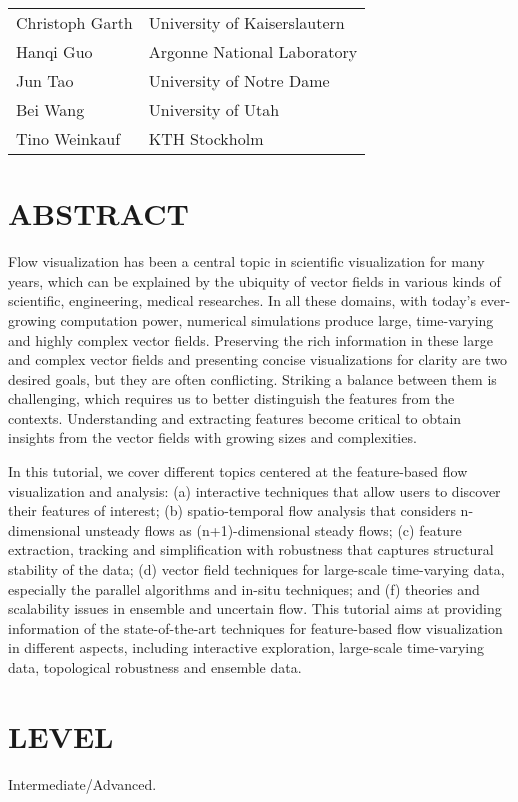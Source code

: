 \documentclass[preprint,journal]{vgtc}       %
\begin{document}
\vspace{-0.1in}
\begin{table}[H]
\begin{tabular}{ll}
Christoph Garth & University of Kaiserslautern\\
Hanqi Guo & Argonne National Laboratory\\
Jun Tao & University of Notre Dame\\
Bei Wang & University of Utah\\
Tino Weinkauf & KTH Stockholm
\end{tabular}
\end{table}

\section*{ABSTRACT}
Flow visualization has been a central topic in scientific visualization for many years, which can be explained by the ubiquity of vector fields in various kinds of scientific, engineering, medical researches. In all these domains, with today's ever-growing computation power, numerical simulations produce large, time-varying and highly complex vector fields. Preserving the rich information in these large and complex vector fields and presenting concise visualizations for clarity are two desired goals, but they are often conflicting. Striking a balance between them is challenging, which requires us to better distinguish the features from the contexts. Understanding and extracting features become critical to obtain insights from the vector fields with growing sizes and complexities.

In this tutorial, we cover different topics centered at the feature-based flow visualization and analysis: (a) interactive techniques that allow users to discover their features of interest; (b) spatio-temporal flow analysis that considers n-dimensional unsteady flows as (n+1)-dimensional steady flows; (c) feature extraction, tracking and simplification with robustness that captures structural stability of the data; (d) vector field techniques for large-scale time-varying data, especially the parallel algorithms and in-situ techniques; and (f) theories and scalability issues in ensemble and uncertain flow. This tutorial aims at providing information of the state-of-the-art techniques for feature-based flow visualization in different aspects, including interactive exploration, large-scale time-varying data, topological robustness and ensemble data.

\section*{LEVEL}
Intermediate/Advanced.
\end{document}
